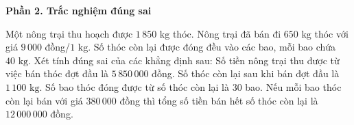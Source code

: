\textbf{Phần 2. Trắc nghiệm đúng sai}

\begin{ex} %
Một nông trại thu hoạch được $1\,850\text{ kg}$ thóc. Nông trại đã bán đi $650\text{ kg}$ thóc với giá $9\,000$ đồng/$1\text{ kg}$. Số thóc còn lại được đóng đều vào các bao, mỗi bao chứa $40\text{ kg}$. Xét tính đúng sai của các khẳng định sau:
\choiceTF
{\True Số tiền nông trại thu được từ việc bán thóc đợt đầu là $5\,850\,000$ đồng.}
{Số thóc còn lại sau khi bán đợt đầu là $1\,100\text{ kg}$.}
{\True Số bao thóc đóng được từ số thóc còn lại là $30$ bao.}
{Nếu mỗi bao thóc còn lại bán với giá $380\,000$ đồng thì tổng số tiền bán hết số thóc còn lại là $12\,000\,000$ đồng.}
\end{ex}


